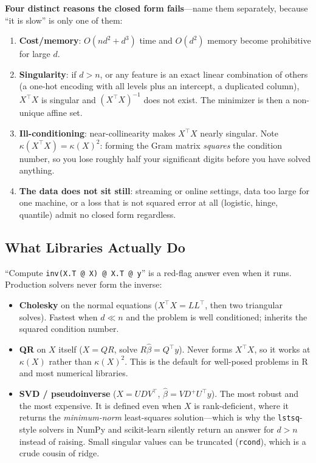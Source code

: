 \begin{warningbox}
\textbf{Four distinct reasons the closed form fails}---name them separately, because ``it is slow'' is only one of them:
\begin{enumerate}
    \item \textbf{Cost/memory}: $O(nd^2 + d^3)$ time and $O(d^2)$ memory become prohibitive for large $d$.
    \item \textbf{Singularity}: if $d > n$, or any feature is an exact linear combination of others (a one-hot encoding with all levels plus an intercept, a duplicated column), $X^{\top}X$ is singular and $(X^{\top}X)^{-1}$ does not exist. The minimizer is then a non-unique affine set.
    \item \textbf{Ill-conditioning}: near-collinearity makes $X^{\top}X$ nearly singular. Note $\kappa(X^{\top}X) = \kappa(X)^2$: forming the Gram matrix \emph{squares} the condition number, so you lose roughly half your significant digits before you have solved anything.
    \item \textbf{The data does not sit still}: streaming or online settings, data too large for one machine, or a loss that is not squared error at all (logistic, hinge, quantile) admit no closed form regardless.
\end{enumerate}
\end{warningbox}

\subsection{What Libraries Actually Do}

``Compute \texttt{inv(X.T @ X) @ X.T @ y}'' is a red-flag answer even when it runs. Production solvers never form the inverse:

\begin{itemize}
    \item \textbf{Cholesky} on the normal equations ($X^{\top}X = LL^{\top}$, then two triangular solves). Fastest when $d \ll n$ and the problem is well conditioned; inherits the squared condition number.
    \item \textbf{QR} on $X$ itself ($X = QR$, solve $R\hat\beta = Q^{\top}y$). Never forms $X^{\top}X$, so it works at $\kappa(X)$ rather than $\kappa(X)^2$. This is the default for well-posed problems in R and most numerical libraries.
    \item \textbf{SVD / pseudoinverse} ($X = UDV^{\top}$, $\hat\beta = V D^{+} U^{\top} y$). The most robust and the most expensive. It is defined even when $X$ is rank-deficient, where it returns the \emph{minimum-norm} least-squares solution---which is why the \texttt{lstsq}-style solvers in NumPy and scikit-learn silently return an answer for $d > n$ instead of raising. Small singular values can be truncated (\texttt{rcond}), which is a crude cousin of ridge.
\end{itemize}

